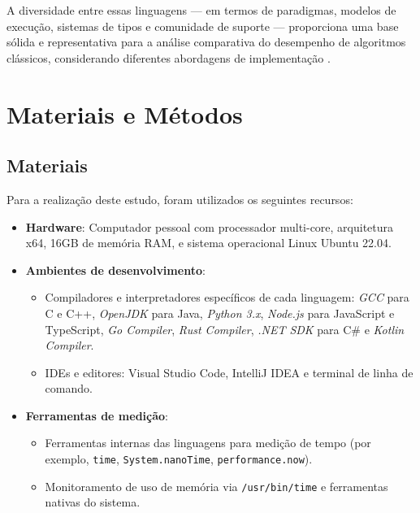 \documentclass[12pt,oneside,a4paper]{report}
\begin{document}
A diversidade entre essas linguagens — em termos de paradigmas, modelos de execução, sistemas de tipos e comunidade de suporte — proporciona uma base sólida e representativa para a análise comparativa do desempenho de algoritmos clássicos, considerando diferentes abordagens de implementação \cite{sebesta2016, scott2015}.


\chapter{Materiais e Métodos}

\section{Materiais}

Para a realização deste estudo, foram utilizados os seguintes recursos:

\begin{itemize}
    \item \textbf{Hardware}: Computador pessoal com processador multi-core, arquitetura x64, 16GB de memória RAM, e sistema operacional Linux Ubuntu 22.04.
    \item \textbf{Ambientes de desenvolvimento}: 
    \begin{itemize}
        \item Compiladores e interpretadores específicos de cada linguagem: \textit{GCC} para C e C++, \textit{OpenJDK} para Java, \textit{Python 3.x}, \textit{Node.js} para JavaScript e TypeScript, \textit{Go Compiler}, \textit{Rust Compiler}, \textit{.NET SDK} para C\# e \textit{Kotlin Compiler}.
        \item IDEs e editores: Visual Studio Code, IntelliJ IDEA e terminal de linha de comando.
    \end{itemize}
    \item \textbf{Ferramentas de medição}: 
    \begin{itemize}
        \item Ferramentas internas das linguagens para medição de tempo (por exemplo, \texttt{time}, \texttt{System.nanoTime}, \texttt{performance.now}).
        \item Monitoramento de uso de memória via \texttt{/usr/bin/time} e ferramentas nativas do sistema.
    \end{itemize}
\end{itemize}
\end{document}

